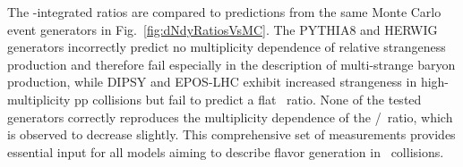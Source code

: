 The \pt-integrated ratios are compared to predictions from the same Monte Carlo event generators 
in Fig.~\ref{fig:dNdyRatiosVsMC}. The PYTHIA8 and HERWIG generators incorrectly predict no multiplicity dependence of
relative strangeness production and therefore fail especially in the description of multi-strange baryon production, 
while DIPSY and EPOS-LHC exhibit increased strangeness in high-multiplicity 
pp collisions but fail to predict a flat \pTopi\ ratio. None of the tested generators correctly reproduces
the multiplicity dependence of the \kstar/\pion\ ratio, which is observed to decrease slightly. This comprehensive set of measurements provides essential input for all models aiming to describe flavor generation in \pp\ collisions. 

